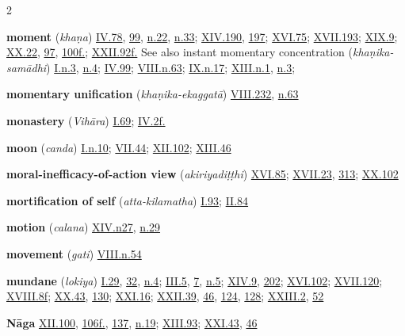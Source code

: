 \begin{multicols}{2}
\begin{vismHanging}
\par\textbf{moment} (\emph{khaṇa}) \hyperlink{IV.78}{IV.78}{}, \hyperlink{IV.99}{99}{}, \hyperlink{IV.n22}{n.22}{}, \hyperlink{IV.n33}{n.33}{}; \hyperlink{XIV.190}{XIV.190}{}, \hyperlink{XIV.197}{197}{}; \hyperlink{XVI.75}{XVI.75}{}; \hyperlink{XVII.193}{XVII.193}{}; \hyperlink{XIX.9}{XIX.9}{}; \hyperlink{XX.22}{XX.22}{}, \hyperlink{XX.97}{97}{}, \hyperlink{XX.100}{100f.}{}; \hyperlink{XXII.92}{XXII.92f.}{} See also instant momentary concentration (\emph{khaṇika-samādhi}) \hyperlink{I.n3}{I.n.3}{}, \hyperlink{I.n4}{n.4}{}; \hyperlink{IV.99}{IV.99}{}; \hyperlink{VIII.n63}{VIII.n.63}{}; \hyperlink{IX.n17}{IX.n.17}{}; \hyperlink{XIII.n1}{XIII.n.1}{}, \hyperlink{XIII.n3}{n.3}{};
\par\textbf{momentary unification} (\emph{khaṇika-ekaggatā}) \hyperlink{VIII.232}{VIII.232}{}, \hyperlink{VIII.n63}{n.63}{}
\par\textbf{monastery} (\emph{Vihāra}) \hyperlink{I.69}{I.69}{}; \hyperlink{IV.2}{IV.2f.}{}
\par\textbf{moon} (\emph{canda}) \hyperlink{I.n10}{I.n.10}{}; \hyperlink{VII.44}{VII.44}{}; \hyperlink{XII.102}{XII.102}{}; \hyperlink{XIII.46}{XIII.46}{}
\par\textbf{moral-inefficacy-of-action view} (\emph{akiriyadiṭṭhi}) \hyperlink{XVI.85}{XVI.85}{}; \hyperlink{XVII.23}{XVII.23}{}, \hyperlink{XVII.313}{313}{}; \hyperlink{XX.102}{XX.102}{}
\par\textbf{mortification of self} (\emph{atta-kilamatha}) \hyperlink{I.93}{I.93}{}; \hyperlink{II.84}{II.84}{}
\par\textbf{motion} (\emph{calana}) \hyperlink{XIV.n7}{XIV.n27}{}, \hyperlink{XIV.n29}{n.29}{}
\par\textbf{movement} (\emph{gati}) \hyperlink{VIII.n54}{VIII.n.54}{}
\par\textbf{mundane} (\emph{lokiya}) \hyperlink{I.29}{I.29}{}, \hyperlink{I.32}{32}{}, \hyperlink{I.n4}{n.4}{}; \hyperlink{III.5}{III.5}{}, \hyperlink{III.7}{7}{}, \hyperlink{III.n5}{n.5}{}; \hyperlink{XIV.9}{XIV.9}{}, \hyperlink{XIV.202}{202}{}; \hyperlink{XVI.102}{XVI.102}{}; \hyperlink{XVII.120}{XVII.120}{}; \hyperlink{XVIII.8}{XVIII.8f}{}; \hyperlink{XX.43}{XX.43}{}, \hyperlink{XX.130}{130}{}; \hyperlink{XXI.16}{XXI.16}{}; \hyperlink{XXII.39}{XXII.39}{}, \hyperlink{XXII.46}{46}{}, \hyperlink{XXII.124}{124}{}, \hyperlink{XXII.128}{128}{}; \hyperlink{XXIII.2}{XXIII.2}{}, \hyperlink{XXIII.52}{52}{}
\par\textbf{Nāga} \hyperlink{XII.100}{XII.100}{}, \hyperlink{XII.106}{106f.}{}, \hyperlink{XII.137}{137}{}, \hyperlink{XII.n19}{n.19}{}; \hyperlink{XIII.93}{XIII.93}{}; \hyperlink{XXI.43}{XXI.43}{}, \hyperlink{XXI.46}{46}{}

\end{vismHanging}
\end{multicols}
